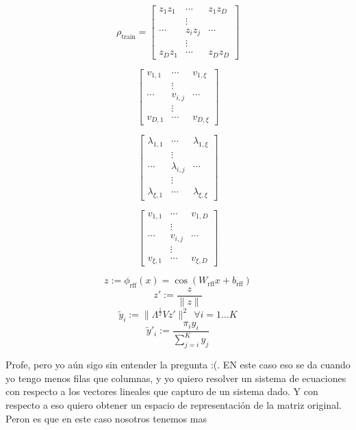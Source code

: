 \[\rho_{\text{train}} = \begin{bmatrix}z_1 z_1 & \cdots & z_1 z_D
								\\ & \vdots
								\\ \cdots & z_i z_j & \cdots
								\\ & \vdots &
								\\ z_D z_1 & \cdots & z_D z_D

								\end{bmatrix}\]


\[ \begin{bmatrix}v_{1,1}  & \cdots & v_{1,\xi}
								\\ & \vdots
								\\ \cdots & v_{i,j} & \cdots
								\\ & \vdots &
								\\ v_{D,1}  & \cdots & v_{D,\xi}

								\end{bmatrix}\]


\[ \begin{bmatrix}\lambda_{1,1}  & \cdots & \lambda_{1,\xi}
								\\ & \vdots
								\\ \cdots & \lambda_{i,j} & \cdots
								\\ & \vdots &
								\\ \lambda_{\xi,1}  & \cdots & \lambda_{\xi,\xi}

								\end{bmatrix}\]


\[ \begin{bmatrix}v_{1,1}  & \cdots & v_{1,D}
								\\ & \vdots
								\\ \cdots & v_{i,j} & \cdots
								\\ & \vdots &
								\\ v_{\xi,1}  & \cdots & v_{\xi,D}

								\end{bmatrix}\]


\[ z := \phi_{\text{rff}}(x)=\cos(W_{\mathrm{rff}}x+b_{\mathrm{rff}}) \]
\[ z'  := \frac{z}{\|z\|} \]
\[ \tilde{y}_i   := \|\Lambda^{\frac{1}{2}}Vz'\|^2 \ \ \forall i=1\dots K \]
\[ \tilde{y}'_i  := \frac{\pi_i y_i}{\sum_{j=i}^K y_j} \]




Profe, pero yo aún sigo sin entender la pregunta :(. EN este caso eso se da cuando yo tengo menos filas que columnas, y yo quiero resolver un sistema de ecuaciones con respecto a los vectores lineales que capturo de un sistema dado. Y con respecto a eso quiero obtener un espacio de representación de la matriz original. Peron es que en este caso nosotros tenemos mas 